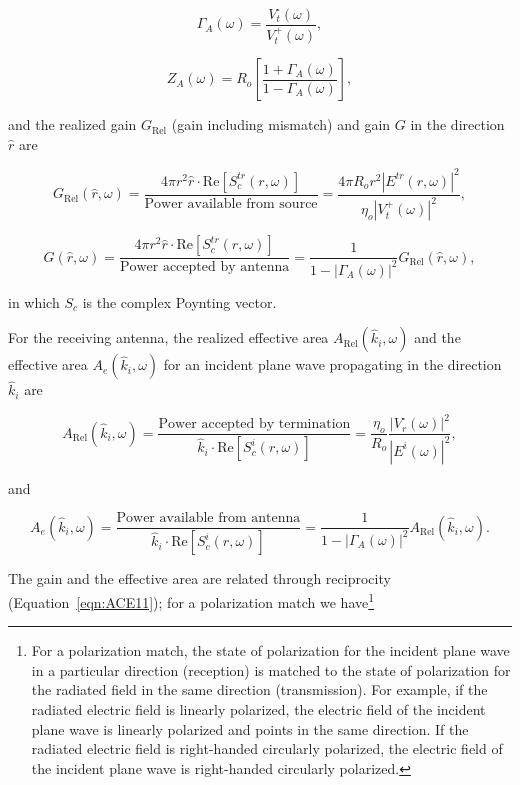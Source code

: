 \begin{equation}
\Gamma_A(\omega) = \frac{V^\text{-}_t(\omega)}{V^\text{+}_t(\omega)} ,
\label{eqn:ACE12}
\end{equation}

\begin{equation}
Z_A(\omega) = R_o \left[ \frac{1+\Gamma_A(\omega)}{1-\Gamma_A(\omega)} \right],
\label{eqn:ACE13}
\end{equation}

\noindent and the realized gain $G_\text{Rel}$ (gain including mismatch) and gain $G$ in the direction $\hat{r}$ are

\begin{equation}
G_\text{Rel}(\hat{r},\omega) = \frac{4\pi r^2\hat{r} \cdot \text{Re} [ S^{tr}_c(r,\omega) ] }{\text{Power available from source}} = \frac{4\pi R_o r^2 | E^{tr}(r,\omega) |^2}{\eta_o | V^\text{+}_t(\omega) |^2} ,
\label{eqn:ACE14}
\end{equation}

\begin{equation}
G(\hat{r},\omega) = \frac{4\pi r^2\hat{r} \cdot \text{Re} [ S^{tr}_c(r,\omega) ] }{\text{Power accepted by antenna}} = \frac{1}{1 - | \Gamma_A(\omega) |^2} G_\text{Rel}(\hat{r},\omega) ,
\label{eqn:ACE15}
\end{equation}

\noindent in which $S_c$ is the complex Poynting vector.

For the receiving antenna, the realized effective area $A_\text{Rel}(\hat{k}_i, \omega)$ and the effective area $A_e(\hat{k}_i,\omega)$ for an incident plane wave propagating in the direction $\hat{k}_i$ are

\begin{equation}
A_\text{Rel}(\hat{k}_i,\omega) = \frac{\text{Power accepted by termination}}{\hat{k}_i \cdot \text{Re} [ S^{i}_c(r,\omega) ] } =  \frac{\eta_o}{R_o}  \frac{| V^\text{-}_r(\omega) |^2}{| E^i(\omega) |^2} ,
\label{eqn:ACE16}
\end{equation}

\noindent and

\begin{equation}
A_e(\hat{k}_i,\omega) = \frac{\text{Power available from antenna}}{\hat{k}_i \cdot \text{Re} [ S^{i}_c(r,\omega) ] } = \frac{1}{1 - | \Gamma_A(\omega) |^2} A_\text{Rel}(\hat{k}_i,\omega) .
\label{eqn:ACE17}
\end{equation}

The gain and the effective area are related through reciprocity (Equation~\ref{eqn:ACE11}); for a polarization match we have\footnote{For a polarization match, the state of polarization for the incident plane wave in a particular direction (reception) is matched to the state of polarization for the radiated field in the same direction (transmission).  For example, if the radiated electric field is linearly polarized, the electric field of the incident plane wave is linearly polarized and points in the same direction.  If the radiated electric field is right-handed circularly polarized, the electric field of the incident plane wave is right-handed circularly polarized.}

